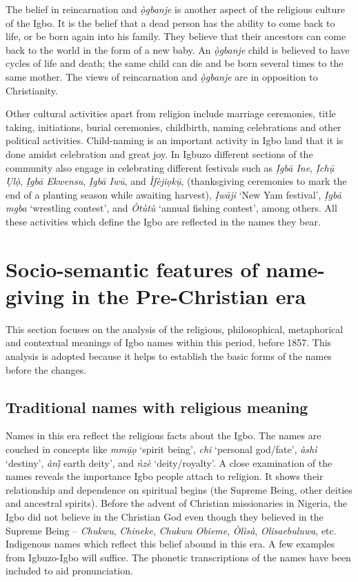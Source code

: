 \documentclass[output=paper]{langscibook}
\begin{document}
The belief in reincarnation and \textit{ọ̀gbanje} is another aspect of the religious culture of the Igbo. It is the belief that a dead person has the ability to come back to life, or be born again into his family. They believe that their ancestors can come back to the world in the form of a new baby. An \textit{ọ̀gbanje} child is believed to have cycles of life and death; the same child can die and be born several times to the same mother. The views of reincarnation and \textit{ọ̀gbanje} are in opposition to Christianity.

Other cultural activities apart from religion include marriage ceremonies, title taking, initiations, burial ceremonies, childbirth, naming celebrations and other political activities. Child-naming is an important activity in Igbo land that it is done amidst celebration and great joy. In Igbuzo different sections of the community also engage in celebrating different festivals such as \textit{Ịgbā Ine}, \textit{Ịchụ̄ Ụlọ̀}, \textit{Ịgbā Ekwensu}, \textit{Ịgbā Iwū}, and \textit{Ìfèjiọkụ̄}, (thanksgiving ceremonies to mark the end of a planting season while awaiting harvest), \textit{Ịwāji} ‘New Yam festival’, \textit{Ịgbā mgba} ‘wrestling contest’, and  \textit{Òtùtù} ‘annual fishing contest’, among others. All these activities which define the Igbo are reflected in the names they bear. 

\section{Socio-semantic features of name-giving in the Pre-Christian era} 
This section focuses on the analysis of the religious, philosophical, metaphorical and contextual meanings of Igbo names within this period, before 1857. This analysis is adopted because it helps to establish the basic forms of the names before the changes. 

\subsection{Traditional names with religious meaning}\label{sec:owaleke:3.1}
Names in this era reflect the religious facts about the Igbo. The names are couch\-ed in concepts like  \textit{mmụ̄ọ} ‘spirit being’,  \textit{chi} ‘personal god/fate’,  \textit{àshì} ‘destiny’,  \textit{ànị̀} earth deity’, and  \textit{ǹzè} ‘deity/royalty’. A close examination of the names reveals the importance Igbo people attach to religion. It shows their relationship and dependence on spiritual begins (the Supreme Being, other deities and ancestral spirits). Before the advent of Christian missionaries in Nigeria, the Igbo did not believe in the Christian God even though they believed in the Supreme Being --  \textit{Chukwu}, \textit{Chineke}, \textit{Chukwu Obieme}, \textit{Òlìsà}, \textit{Olisaebuluwa}, etc. Indigenous names which reflect this belief abound in this era. A few examples from Igbuzo-Igbo will suffice. The phonetic transcriptions of the names have been included to aid pronunciation.
\end{document}
